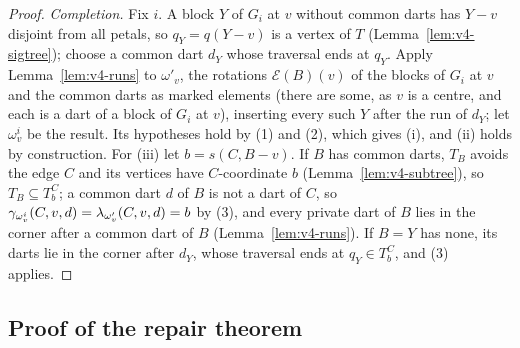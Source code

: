\begin{proof}
\emph{Completion.} Fix $i$. A block $Y$ of $G_i$ at $v$ without common darts
has $Y-v$ disjoint from all petals, so $q_Y=q(Y-v)$ is a vertex of $T$
(Lemma~\ref{lem:v4-sigtree}); choose a common dart $d_Y$ whose traversal
ends at $q_Y$. Apply Lemma~\ref{lem:v4-runs} to $\omega'_v$, the rotations
$\mathcal E(B)(v)$ of the blocks of $G_i$ at $v$ and the common darts as
marked elements (there are some, as $v$ is a centre, and each is a dart of a
block of $G_i$ at $v$), inserting every such $Y$ after the run of $d_Y$; let
$\omega^i_v$ be the result. Its hypotheses hold by (1) and (2), which gives
(i), and (ii) holds by construction. For (iii) let $b=s(C,B-v)$. If $B$ has
common darts, $T_B$ avoids the edge $C$ and its vertices have
$C$-coordinate $b$ (Lemma~\ref{lem:v4-subtree}), so $T_B\subseteq T^C_b$; a
common dart $d$ of $B$ is not a dart of $C$, so
$\gamma_{\omega^i_v}(C,v,d)=\lambda_{\omega'_v}(C,v,d)=b$ by (3), and every
private dart of $B$ lies in the corner after a common dart of $B$
(Lemma~\ref{lem:v4-runs}). If $B=Y$ has none, its darts lie in the corner
after $d_Y$, whose traversal ends at $q_Y\in T^C_b$, and (3) applies.
\end{proof}

\subsection{Proof of the repair theorem}\label{sec:v4-global}


